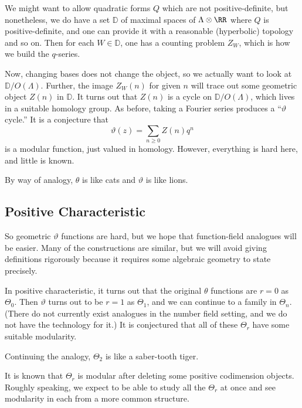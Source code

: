 \documentclass{article}
\begin{document}
We might want to allow quadratic forms $Q$ which are not positive-definite, but nonetheless, we do have a set $\mathbb D$ of maximal spaces of $\Lambda\otimes\RR$ where $Q$ is positive-definite, and one can provide it with a reasonable (hyperbolic) topology and so on. Then for each $W\in\mathbb D$, one has a counting problem $Z_W$, which is how we build the $q$-series.

Now, changing bases does not change the object, so we actually want to look at $\mathbb D/O(\Lambda)$. Further, the image $Z_W(n)$ for given $n$ will trace out some geometric object $Z(n)$ in $\mathbb D$. It turns out that $Z(n)$ is a cycle on $\mathbb D/O(\Lambda)$, which lives in a suitable homology group. As before, taking a Fourier series produces a ``$\vartheta$ cycle.'' It is a conjecture that
\[\vartheta(z)=\sum_{n\ge0}Z(n)q^n\]
is a modular function, just valued in homology. However, everything is hard here, and little is known.
\begin{remark}
	By way of analogy, $\theta$ is like cats and $\vartheta$ is like lions.
\end{remark}

\subsection{Positive Characteristic}
So geometric $\vartheta$ functions are hard, but we hope that function-field analogues will be easier. Many of the constructions are similar, but we will avoid giving definitions rigorously because it requires some algebraic geometry to state precisely.

In positive characteristic, it turns out that the original $\theta$ functions are $r=0$ as $\Theta_0$. Then $\vartheta$ turns out to be $r=1$ as $\Theta_1$, and we can continue to a family in $\Theta_n$. (There do not currently exist analogues in the number field setting, and we do not have the technology for it.) It is conjectured that all of these $\Theta_r$ have some suitable modularity.
\begin{remark}
	Continuing the analogy, $\Theta_2$ is like a saber-tooth tiger.
\end{remark}
It is known that $\Theta_r$ is modular after deleting some positive codimension objects. Roughly speaking, we expect to be able to study all the $\Theta_r$ at once and see modularity in each from a more common structure.
\end{document}
